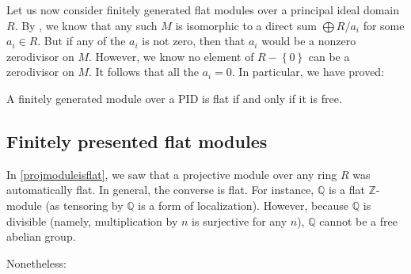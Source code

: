 \begin{example} 
Let us now consider finitely generated flat modules over a principal ideal
domain $R$. By , we know that any such $M$ is isomorphic to a
direct sum $\bigoplus R/a_i$ for some $a_i \in R$. But if any of the $a_i$ is
not zero, then that $a_i$ would be a nonzero zerodivisor on $M$. However, we
know no element of $R - \left\{0\right\}$ can be a zerodivisor on $M$. It
follows that all the $a_i = 0$. In particular, we have proved:

\begin{proposition} 
A finitely generated module over a PID is flat if and only if it is free.
\end{proposition} 
\end{example} 

\subsection{Finitely presented flat modules}
In \cref{projmoduleisflat}, we saw that a projective module over any ring $R$
was automatically flat. In general, the converse is flat. For instance,
$\mathbb{Q}$ is a flat $\mathbb{Z}$-module (as tensoring by $\mathbb{Q}$ is a
form of localization). However, because $\mathbb{Q}$ is divisible (namely,
multiplication by $n$ is surjective for any $n$), $\mathbb{Q}$ cannot be a free
abelian group.

Nonetheless:

